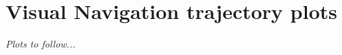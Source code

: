 \documentclass[a4paper,12pt]{article}
\begin{document}


\newpage

\appendix
\section{Visual Navigation trajectory plots} \label{app:plots}
\textit{Plots to follow...}
\end{document}
